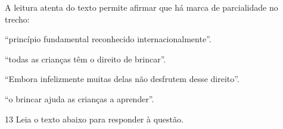 A leitura atenta do texto permite afirmar que há marca de parcialidade
no trecho:

\begin{escolha}
  
    \item ``princípio fundamental reconhecido internacionalmente''.
  
    \item ``todas as crianças têm o direito de brincar''.
  
    \item ``Embora infelizmente muitas delas não desfrutem desse direito''.
  
    \item ``o brincar ajuda as crianças a aprender''.

\end{escolha}

\num{13} Leia o texto abaixo para responder à questão. 

